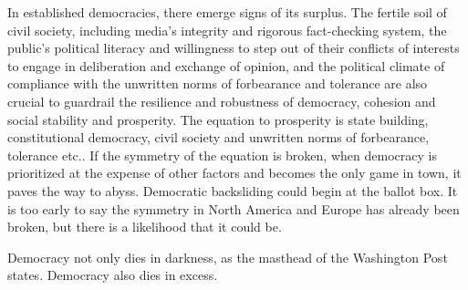 \documentclass{scrartcl}
\begin{document}
In established democracies,
 there emerge signs of its surplus.
 The fertile soil of civil society,
including media's integrity and
rigorous fact-checking system, the public's political literacy and
willingness to step out of their conflicts of interests to engage
in deliberation and exchange of opinion, and the political climate
of compliance with the unwritten norms of forbearance and tolerance
are also crucial to guardrail the resilience and robustness of democracy,
cohesion and social stability and prosperity. The equation to prosperity
is state building, constitutional democracy, civil society and unwritten
norms of forbearance, tolerance etc.. If the symmetry of the equation
is broken, when democracy is prioritized at the expense of other factors
and becomes the only game in town, it paves the way to abyss. Democratic
backsliding could begin at the ballot box. 
It is too early to say
the symmetry in North America and Europe has already been broken,
but there is a likelihood that it could be.

Democracy not only dies in darkness,
 as the masthead of the Washington Post states.
 Democracy also dies in excess.

\printbibliography
\end{document}
